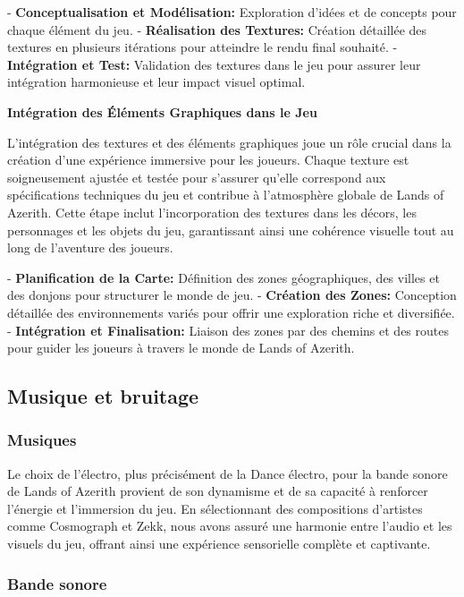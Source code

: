 - \textbf{Conceptualisation et Modélisation:} Exploration d'idées et de concepts pour chaque élément du jeu.
- \textbf{Réalisation des Textures:} Création détaillée des textures en plusieurs itérations pour atteindre le rendu final souhaité.
- \textbf{Intégration et Test:} Validation des textures dans le jeu pour assurer leur intégration harmonieuse et leur impact visuel optimal.

\textbf{Intégration des Éléments Graphiques dans le Jeu}

L'intégration des textures et des éléments graphiques joue un rôle crucial dans la création d'une expérience immersive pour les joueurs. Chaque texture est soigneusement ajustée et testée pour s'assurer qu'elle correspond aux spécifications techniques du jeu et contribue à l'atmosphère globale de Lands of Azerith. Cette étape inclut l'incorporation des textures dans les décors, les personnages et les objets du jeu, garantissant ainsi une cohérence visuelle tout au long de l'aventure des joueurs. 

- \textbf{Planification de la Carte:} Définition des zones géographiques, des villes et des donjons pour structurer le monde de jeu.
- \textbf{Création des Zones:} Conception détaillée des environnements variés pour offrir une exploration riche et diversifiée.
- \textbf{Intégration et Finalisation:} Liaison des zones par des chemins et des routes pour guider les joueurs à travers le monde de Lands of Azerith.

\subsection{Musique et bruitage}

\subsubsection{Musiques}

Le choix de l'électro, plus précisément de la Dance électro, pour la bande sonore de Lands of Azerith provient de son dynamisme et de sa capacité à renforcer l'énergie et l'immersion du jeu. 
En sélectionnant des compositions d'artistes comme Cosmograph et Zekk, nous avons assuré une harmonie entre l'audio et les visuels du jeu, offrant ainsi une expérience sensorielle complète et captivante.

\subsubsection{Bande sonore}

